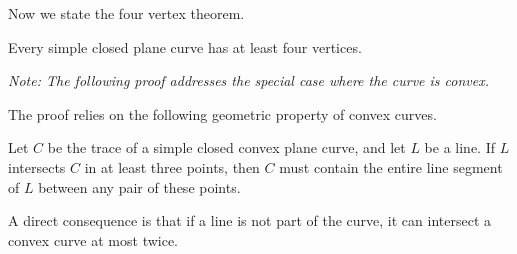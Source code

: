 \documentclass{article}
\begin{document}
Now we state the four vertex theorem.

\begin{theorem}
\label{thm:four_vertex}
Every simple closed plane curve has at least four vertices.
\end{theorem}

\noindent
\textit{Note: The following proof addresses the special case where the curve is convex.}

The proof relies on the following geometric property of convex curves.

\begin{lemma}
\label{lem:convexity}
Let $C$ be the trace of a simple closed convex plane curve, and let $L$ be a line. If $L$ intersects $C$ in at least three points, then $C$ must contain the entire line segment of $L$ between any pair of these points.
\end{lemma}

\noindent
A direct consequence is that if a line is not part of the curve, it can intersect a convex curve at most twice.
\end{document}
